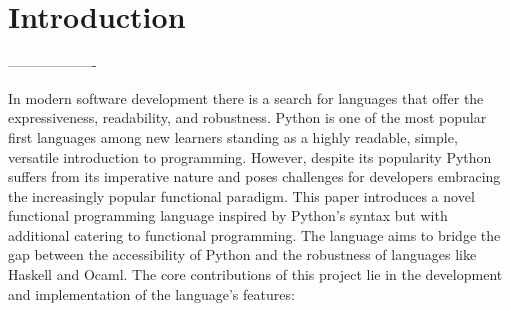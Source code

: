\documentclass{l4proj}
\begin{document}
\tableofcontents

%
%
%
%
%
%
%
%
\chapter{Introduction}




-------------------

In modern software development there is a search for languages that offer the expressiveness, readability, and robustness.
Python is one of the most popular first languages among new learners standing as a highly readable, simple, versatile introduction to programming.
However, despite its popularity Python suffers from its imperative nature and poses challenges for developers embracing the increasingly popular functional paradigm.
This paper introduces a novel functional programming language inspired by Python’s syntax but with additional catering to functional programming.
The language aims to bridge the gap between the accessibility of Python and the robustness of languages like Haskell and Ocaml.
The core contributions of this project lie in the development and implementation of the language’s features:
\end{document}
